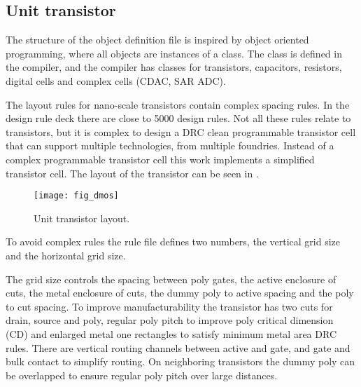 \subsection{Unit transistor} \label{unittransistor}

The structure of the object definition file is
inspired by object oriented programming, where all objects are
instances of a class. The class is defined in the compiler,
and the compiler has classes for transistors, capacitors, resistors,
digital cells and complex cells (CDAC, SAR ADC).

The layout rules for nano-scale
transistors contain complex spacing rules. In the {\technm}
design rule deck there are close to 5000 design rules.
Not all these rules relate to transistors, but it is complex to design a DRC clean
programmable transistor cell that can support multiple technologies,
from multiple foundries.
Instead of a complex programmable transistor cell this work
implements a simplified transistor cell.  The layout of the transistor can be
seen in .

\begin{figure}[t]
\centering
\centerline{\texttt{[image: fig\_dmos]}}
\caption{Unit transistor layout.}
\label{fig_dmos}
\end{figure}

To avoid complex rules the rule file defines two numbers, the vertical grid size and
the horizontal grid size. 

The grid size controls the spacing
between poly gates, the active enclosure of cuts, the metal enclosure of
cuts, the dummy poly to active spacing and the poly to cut
spacing. To improve
manufacturability the transistor has two cuts for drain, source and poly,
regular poly pitch to improve poly critical dimension (CD) and
enlarged metal one rectangles to satisfy minimum metal
area DRC rules.
There are vertical routing channels between
active and gate, and gate and bulk contact to simplify
routing. On neighboring transistors the dummy poly can be overlapped to
ensure regular poly pitch over large distances.

